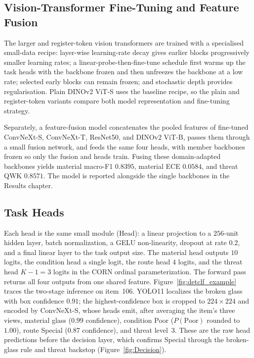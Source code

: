 \subsection{Vision-Transformer Fine-Tuning and Feature Fusion}
\label{sec:fusion}
The larger and register-token vision transformers are trained with a specialised small-data recipe: layer-wise learning-rate decay gives earlier blocks progressively smaller learning rates; a linear-probe-then-fine-tune schedule first warms up the task heads with the backbone frozen and then unfreezes the backbone at a low rate; selected early blocks can remain frozen; and stochastic depth provides regularisation. Plain DINOv2 ViT-S uses the baseline recipe, so the plain and register-token variants compare both model representation and fine-tuning strategy.

Separately, a feature-fusion model concatenates the pooled features of fine-tuned ConvNeXt-S, ConvNeXt-T, ResNet50, and DINOv2 ViT-B, passes them through a small fusion network, and feeds the same four heads, with member backbones frozen so only the fusion and heads train. Fusing these domain-adapted backbones yields material macro-F1 $0.8395$, material ECE $0.0584$, and threat QWK $0.8571$. The model is reported alongside the single backbones in the Results chapter.

\subsection{Task Heads}
Each head is the same small module (Head): a linear projection to a $256$-unit hidden layer, batch normalization, a GELU non-linearity, dropout at rate $0.2$, and a final linear layer to the task output size. The material head outputs $10$ logits, the condition head a single logit, the route head $4$ logits, and the threat head $K-1=3$ logits in the CORN ordinal parameterization. The forward pass returns all four outputs from one shared feature. Figure~\ref{fig:detclf_example} traces the two-stage inference on item~106. YOLO11 localizes the broken glass with box confidence $0.91$; the highest-confidence box is cropped to $224\times224$ and encoded by ConvNeXt-S, whose heads emit, after averaging the item's three views, material glass ($0.99$ confidence), condition Poor ($P(\text{Poor})$ rounded to $1.00$), route Special ($0.87$ confidence), and threat level~3. These are the raw head predictions before the decision layer, which confirms Special through the broken-glass rule and threat backstop (Figure~\ref{fig:Decision}).

